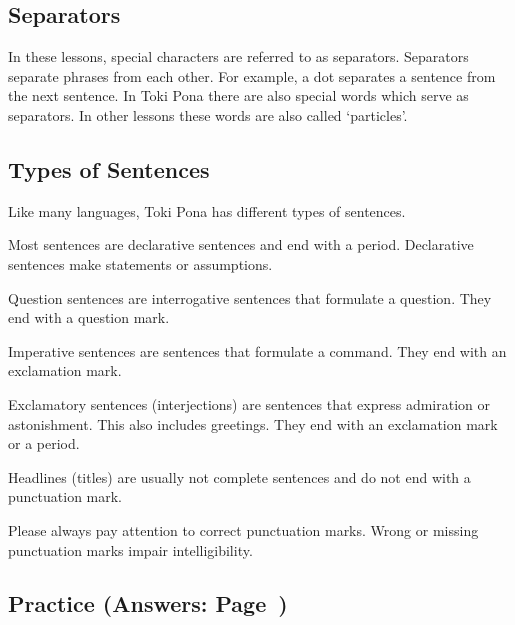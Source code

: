 %
\subsection*{Separators}
%
In these lessons, special characters are referred to as separators. 
Separators separate phrases from each other. 
For example, a dot separates a sentence from the next sentence. 
In Toki Pona there are also special words which serve as separators. 
In other lessons these words are also called `particles'.

%
\subsection*{Types of Sentences}
%
%
Like many languages, Toki Pona has different types of sentences. 

Most sentences are declarative sentences and end with a period. 
Declarative sentences make statements or assumptions. 

Question sentences are interrogative sentences that formulate a question. 
They end with a question mark. 

Imperative sentences are sentences that formulate a command. 
They end with an exclamation mark.

Exclamatory sentences (interjections) are sentences that express admiration or astonishment. 
This also includes greetings. 
They end with an exclamation mark or a period.

Headlines (titles) are usually not complete sentences and do not end with a punctuation mark.

Please always pay attention to correct punctuation marks. 
Wrong or missing punctuation marks impair intelligibility.

%
\newpage
\subsection*{Practice (Answers: Page~\pageref{'pronunciation_alphabet'})}

